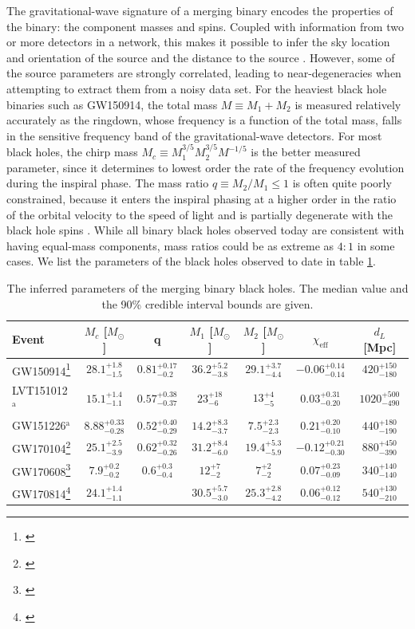 \documentclass[iop,onecolumn]{revtex4}
\begin{document}
The gravitational-wave signature of a merging binary encodes the properties of the binary: the component masses and spins. Coupled with information from two or more detectors in a network, this makes it possible to infer the sky location and orientation of the source and the distance to the source \citep{Veitch:2015,GW150914:PE}.  However, some of the source parameters are strongly correlated, leading to near-degeneracies when attempting to extract them from a noisy data set.   For the heaviest black hole binaries such as GW150914, the total mass $M \equiv M_1 + M_2$ is measured relatively accurately as the ringdown, whose frequency is a function of the total mass, falls in the sensitive frequency band of the gravitational-wave detectors.  For most black holes, the chirp mass $M_c \equiv M_1^{3/5} M_2^{3/5} M^{-1/5}$ is the better measured parameter, since it determines to lowest order the rate of the frequency evolution during the inspiral phase.  The mass ratio $q\equiv M_2/M_1 \leq 1$ is often quite poorly constrained, because it enters the inspiral phasing at a higher order in the ratio of the orbital velocity to the speed of light and is partially degenerate with the black hole spins \citep[e.g.,][]{PoissonWill:1995}.  While all binary black holes observed today are consistent with having equal-mass components, mass ratios could be as extreme as $4:1$ in some cases.  We list the parameters of the black holes observed to date in table \ref{table:BHmasses}.

 
\begin{table}
\begin{tabular}{lcccccc}
Event  & $M_c$ [$M_\odot$]  & q & $M_1$ [$M_\odot$]  & $M_2$ [$M_\odot$]  & $\chi_\textrm{eff}$ & $d_L$ [Mpc] \\
\hline
GW150914\footnote{\citet{BBH:O1}} & $28.1^{+1.8}_{-1.5}$ & $0.81^{+0.17}_{-0.2}$ & $36.2^{+5.2}_{-3.8}$ & $29.1^{+3.7}_{-4.4}$ & $-0.06^{+0.14}_{-0.14}$ & $420^{+150}_{-180}$\\
LVT151012$^\mathrm{a}$ & $15.1^{+1.4}_{-1.1}$ &$0.57^{+0.38}_{-0.37}$ &$23^{+18}_{-6}$ &$13^{+4}_{-5}$ &$0.03^{+0.31}_{-0.20}$ &$1020^{+500}_{-490}$\\
GW151226$^\mathrm{a}$ & $8.88^{+0.33}_{-0.28}$ &$0.52^{+0.40}_{-0.29}$ &$14.2^{+8.3}_{-3.7}$ &$7.5^{+2.3}_{-2.3}$ &$0.21^{+0.20}_{-0.10}$ &$440^{+180}_{-190}$ \\
GW170104\footnote{\citet{GW170104}} & $25.1^{+2.5}_{-3.9}$ &$0.62^{+0.32}_{-0.26}$ &$31.2^{+8.4}_{-6.0}$ &$19.4^{+5.3}_{-5.9}$ &$-0.12^{+0.21}_{-0.30}$ &$880^{+450}_{-390}$\\
GW170608\footnote{\citet{GW170608}} & $7.9^{+0.2}_{-0.2}$ &$0.6^{+0.3}_{-0.4}$ &$12^{+7}_{-2}$ &$7^{+2}_{-2}$ &$0.07^{+0.23}_{-0.09}$ &$340^{+140}_{-140}$ \\
GW170814\footnote{\citet{GW170814}} & $24.1^{+1.4}_{-1.1}$ & &$30.5^{+5.7}_{-3.0}$ &$25.3^{+2.8}_{-4.2}$ &$0.06^{+0.12}_{-0.12}$ & $540^{+130}_{-210}$ \\
\hline
\end{tabular}
\caption{The inferred parameters of the merging binary black holes.  The median value and the 90\% credible interval bounds are given.}\label{table:BHmasses}
\end{table}
\end{document}
